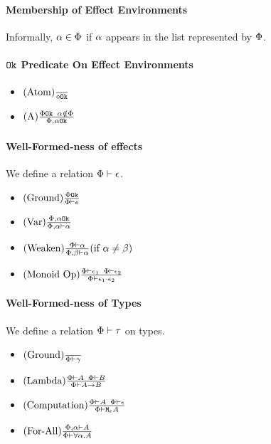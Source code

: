 {\paragraph{Membership of Effect Environments}
Informally, $\a \in \P$ if $\a$ appears in the list represented by $\P$.

\paragraph{$\ok{}$ Predicate On Effect Environments}
\begin{itemize}
    \item $\treerule{Atom}{}{\ok{\nil}}$
    \item $\treerule{A}{\ok{\P} \s\s \a\notin \P}{\ok{\P, \a}}$
\end{itemize}

\paragraph{Well-Formed-ness of effects}
We define a relation $\wellformed{\P}{\e}$.

\begin{itemize}
    \item $\treerule{Ground}{\ok{\P}}{\wellformed{\P}{e}}$
    \item $\treerule{Var}{\ok{\P,\a}}{\wellformed{\P,\a}{\a}}$
    \item $\condtreerule{Weaken}{\wellformed{\P}{\a}}{\wellformed{\P,\b}{\a}}{\a\neq\b}$
    \item $\treerule{Monoid Op}{\wellformed{\P}{\e_1}\s\s\wellformed{\P}{\e_2}}{\wellformed{\P}{\e_1\dot\e_2}}$
\end{itemize}

\paragraph{Well-Formed-ness of Types}
We define a relation $\wellformed{\P}{\tau}$ on types.

\begin{itemize}
    \item $\treerule{Ground}{}{\wellformed{\P}{\g}}$
    \item $\treerule{Lambda}{\wellformed{\P}{A}\s\s\wellformed{\P}{B}}{\wellformed{\P}{\ab}}$
    \item $\treerule{Computation}{\wellformed{\P}{A}\s\s\wellformed{\P}{\e}}{\wellformed{\P}{\mea}}$
    \item $\treerule{For-All}{\wellformed{\P,\a}{A}}{\wellformed{\P}{\all{\a}{A}}}$
\end{itemize}

}
